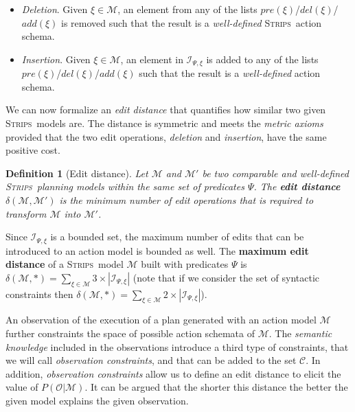 \documentclass[letterpaper]{article} %
\newcommand{\strips}{\textsc{Strips}}     %
\newtheorem{definition}[theorem]{Definition}
\begin{document}
\begin{itemize}
\item {\em Deletion}. Given $\xi\in\mathcal{M}$, an element from any of the lists $pre(\xi)$/$del(\xi)$/$add(\xi)$ is removed such that the result is a {\em well-defined} \strips\ action schema.
\item {\em Insertion}. Given $\xi\in\mathcal{M}$, an element in ${\mathcal I}_{\Psi,\xi}$ is added to any of the lists $pre(\xi)$/$del(\xi)$/$add(\xi)$ such that the result is a {\em well-defined} action schema.
\end{itemize}

We can now formalize an {\em edit distance} that quantifies how similar two given \strips\ models are. The distance is symmetric and meets the {\em metric axioms} provided that the two edit operations, {\em deletion} and {\em insertion}, have the same positive cost.

\begin{definition}[Edit distance]
  Let $\mathcal{M}$ and $\mathcal{M}'$ be two {\em comparable} and {\em well-defined} \strips\ planning models within the same set of predicates $\Psi$. The {\bf edit distance} $\delta(\mathcal{M},\mathcal{M}')$ is the minimum number of {\em edit operations} that is required to transform $\mathcal{M}$ into $\mathcal{M}'$.
\end{definition}

Since ${\mathcal I}_{\Psi,\xi}$ is a bounded set, the maximum number of edits that can be introduced to an action model is bounded as well. The \textbf{maximum edit distance} of a \strips\ model $\mathcal{M}$ built with predicates $\Psi$ is $\delta(\mathcal{M},*)=\sum_{\xi\in\mathcal{M}} 3\times|{\mathcal I}_{\Psi,\xi}|$ (note that if we consider the set of syntactic constraints then $\delta(\mathcal{M},*)=\sum_{\xi\in\mathcal{M}} 2\times|{\mathcal I}_{\Psi,\xi}|$).

\vspace{0.02cm}

An observation of the execution of a plan generated with an action model $\mathcal{M}$ further constraints the space of possible action schemata of $\mathcal{M}$. The \emph{semantic knowledge} included in the observations introduce a third type of constraints, that we will call {\em observation constraints}, and that can be added to the set $\mathcal{C}$. In addition, {\em observation constraints} allow us to define an edit distance to elicit the value of $P(\mathcal{O}|\mathcal{M})$. It can be argued that the shorter this distance the better the given model explains the given observation.
\end{document}
